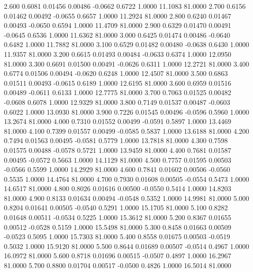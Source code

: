    2.600   0.6081   0.01456   0.00486  -0.0662   0.6722   1.0000  11.1083  81.0000
   2.700   0.6156   0.01462   0.00492  -0.0655   0.6657   1.0000  11.2924  81.0000
   2.800   0.6240   0.01467   0.00493  -0.0650   0.6594   1.0000  11.4709  81.0000
   2.900   0.6329   0.01470   0.00491  -0.0645   0.6536   1.0000  11.6362  81.0000
   3.000   0.6425   0.01474   0.00486  -0.0640   0.6482   1.0000  11.7882  81.0000
   3.100   0.6529   0.01482   0.00480  -0.0638   0.6430   1.0000  11.9357  81.0000
   3.200   0.6615   0.01493   0.00484  -0.0633   0.6374   1.0000  12.0950  81.0000
   3.300   0.6691   0.01500   0.00491  -0.0626   0.6311   1.0000  12.2721  81.0000
   3.400   0.6774   0.01506   0.00494  -0.0620   0.6248   1.0000  12.4507  81.0000
   3.500   0.6863   0.01511   0.00493  -0.0615   0.6189   1.0000  12.6195  81.0000
   3.600   0.6959   0.01516   0.00489  -0.0611   0.6133   1.0000  12.7775  81.0000
   3.700   0.7063   0.01525   0.00482  -0.0608   0.6078   1.0000  12.9329  81.0000
   3.800   0.7149   0.01537   0.00487  -0.0603   0.6022   1.0000  13.0930  81.0000
   3.900   0.7226   0.01545   0.00496  -0.0596   0.5960   1.0000  13.2674  81.0000
   4.000   0.7310   0.01552   0.00499  -0.0591   0.5897   1.0000  13.4469  81.0000
   4.100   0.7399   0.01557   0.00499  -0.0585   0.5837   1.0000  13.6188  81.0000
   4.200   0.7494   0.01563   0.00495  -0.0581   0.5779   1.0000  13.7818  81.0000
   4.300   0.7598   0.01575   0.00488  -0.0578   0.5721   1.0000  13.9459  81.0000
   4.400   0.7681   0.01587   0.00495  -0.0572   0.5663   1.0000  14.1129  81.0000
   4.500   0.7757   0.01595   0.00503  -0.0566   0.5599   1.0000  14.2929  81.0000
   4.600   0.7841   0.01602   0.00506  -0.0560   0.5535   1.0000  14.4764  81.0000
   4.700   0.7930   0.01608   0.00505  -0.0554   0.5473   1.0000  14.6517  81.0000
   4.800   0.8026   0.01616   0.00500  -0.0550   0.5414   1.0000  14.8203  81.0000
   4.900   0.8133   0.01634   0.00494  -0.0548   0.5352   1.0000  14.9981  81.0000
   5.000   0.8204   0.01641   0.00505  -0.0540   0.5291   1.0000  15.1705  81.0000
   5.100   0.8282   0.01648   0.00511  -0.0534   0.5225   1.0000  15.3612  81.0000
   5.200   0.8367   0.01655   0.00512  -0.0528   0.5159   1.0000  15.5498  81.0000
   5.300   0.8458   0.01663   0.00509  -0.0523   0.5095   1.0000  15.7303  81.0000
   5.400   0.8558   0.01675   0.00503  -0.0519   0.5032   1.0000  15.9120  81.0000
   5.500   0.8644   0.01689   0.00507  -0.0514   0.4967   1.0000  16.0972  81.0000
   5.600   0.8718   0.01696   0.00515  -0.0507   0.4897   1.0000  16.2967  81.0000
   5.700   0.8800   0.01704   0.00517  -0.0500   0.4826   1.0000  16.5014  81.0000
